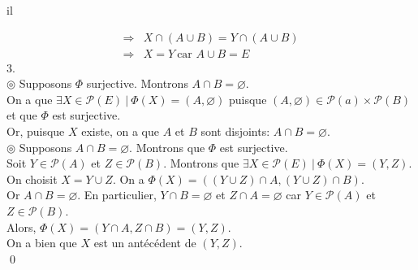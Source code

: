 il\documentclass[10pt]{article}
\begin{document}
\begin{tcolorbox}[enhanced, width=7.6in, center, size=fbox, fontupper=\large, drop shadow southwest]
\begin{align*}
        \Longrightarrow& X \cap (A \cup B) = Y \cap (A \cup B)\\
        \Longrightarrow& X = Y ~ \text{car } A \cup B = E 
    \end{align*}
    3.\\
    $\circledcirc$ Supposons $\varPhi$ surjective. Montrons $A \cap B = \varnothing$.\\
    On a que $\exists X \in \mathcal{P}(E) ~ | ~ \varPhi(X) = (A, \varnothing)$ puisque $(A, \varnothing) \in \mathcal{P}(a) \times \mathcal{P}(B)$ et que $\varPhi$ est surjective.\\
    Or, puisque $X$ existe, on a que $A$ et $B$ sont disjoints:  $A \cap B = \varnothing$.\\[0.1cm]
    $\circledcirc$ Supposons $A \cap B = \varnothing$. Montrons que $\varPhi$ est surjective.\\
    Soit $Y \in \mathcal{P}(A)$ et $Z \in \mathcal{P}(B)$. Montrons que $\exists X \in \mathcal{P}(E) ~ | ~ \varPhi(X) = (Y, Z)$.\\
    On choisit $X = Y \cup Z$. On a $\varPhi(X)=((Y \cup Z) \cap A, (Y \cup Z) \cap B)$.\\
    Or $A \cap B = \varnothing$. En particulier, $Y \cap B = \varnothing$ et $Z\cap A = \varnothing$ car $Y\in\mathcal{P}(A)$ et $Z \in \mathcal{P}(B)$.\\
    Alors, $\varPhi(X)=(Y \cap A, Z \cap B)=(Y,Z)$.\\
    On a bien que $X$ est un antécédent de $(Y,Z)$.\\
    \qed
\end{tcolorbox}
\end{document}
